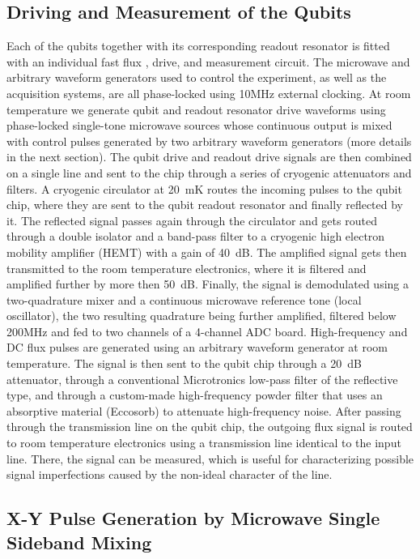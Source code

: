 \subsection{Driving and Measurement of the Qubits}

Each of the qubits together with its corresponding readout resonator is fitted with an individual fast flux , drive, and measurement circuit. The microwave and arbitrary waveform generators used to control the experiment, as well as the acquisition systems, are all phase-locked using 10MHz external clocking.
At room temperature we generate qubit and readout resonator drive waveforms using phase-locked single-tone microwave sources whose continuous output is mixed with control pulses generated by two arbitrary waveform generators (more details in the next section). The qubit drive and readout drive signals are then combined on a single line and sent to the chip through a series of cryogenic attenuators and filters. A cryogenic circulator at 20~mK routes the incoming pulses to the qubit chip, where they are sent to the qubit readout resonator and finally reflected by it. The reflected signal passes again through the circulator and gets routed through a double isolator and a band-pass filter to a cryogenic high electron mobility amplifier (HEMT) with a gain of 40~dB. The amplified signal gets then transmitted to the room temperature electronics, where it is filtered and amplified further by more then 50~dB. Finally, the signal is demodulated using a two-quadrature mixer and a continuous microwave reference tone (local oscillator), the two resulting quadrature being further amplified, filtered below 200MHz and  fed to two channels of  a 4-channel ADC board.
High-frequency and DC flux pulses are generated using an arbitrary waveform generator at room temperature. The signal is then sent to the qubit chip through a 20~dB attenuator, through a conventional Microtronics low-pass filter of the reflective type, and through a custom-made high-frequency powder filter that uses an absorptive material (Eccosorb) to attenuate high-frequency noise. After passing through the transmission line on the qubit chip, the outgoing flux signal is routed to room temperature electronics using a transmission line identical to the input line. There, the signal can be measured, which is useful for characterizing possible signal imperfections caused by the non-ideal character of the line.

\subsection{X-Y Pulse Generation by Microwave Single Sideband Mixing}

